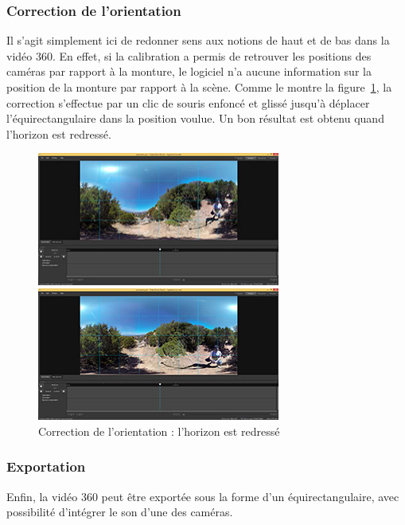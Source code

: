 \subsubsection{Correction de l'orientation}
Il s'agit simplement ici de redonner sens aux notions de haut et de bas dans la 
vidéo 360. En effet, si la calibration a permis de retrouver les positions des 
caméras par rapport à la monture, le logiciel n'a aucune information sur la position
de la monture par rapport à la scène. Comme le montre la figure~\ref{orientation},
la correction s'effectue par un clic de souris enfoncé
et glissé jusqu'à déplacer l'équirectangulaire dans la position voulue. Un bon résultat
est obtenu quand l'horizon est redressé.
\begin{figure}
  \centering
  \begin{minipage}{0.45\textwidth}
    \centering
    \includegraphics[width=8.0cm]{images/studio-output-exposure-grid.jpg}
  \end{minipage}%
  \hspace{0.08\textwidth}
  \begin{minipage}{0.45\textwidth}
    \centering
    \includegraphics[width=8.0cm]{images/studio-output-exposure-grid-oriented.jpg}
  \end{minipage}
  \caption{Correction de l'orientation : l'horizon est redressé}
  \label{orientation}
\end{figure}

\subsubsection{Exportation}
\label{exportation}
Enfin, la vidéo 360 peut être exportée sous la forme d'un équirectangulaire, avec
possibilité d'intégrer le son d'une des caméras.

